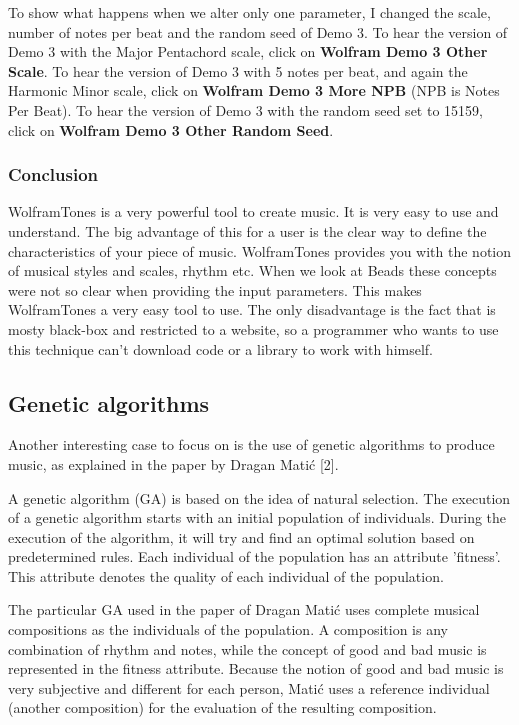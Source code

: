 \documentclass[12pt]{article}
\begin{document}
To show what happens when we alter only one parameter, I changed the scale, number of notes per beat and the random seed of Demo 3. To hear the version of Demo 3 with the Major Pentachord scale, click on \textbf{Wolfram Demo 3 Other Scale}. To hear the version of Demo 3 with 5 notes per beat, and again the Harmonic Minor scale, click on \textbf{Wolfram Demo 3 More NPB} (NPB is Notes Per Beat). To hear the version of Demo 3 with the random seed set to 15159, click on \textbf{Wolfram Demo 3 Other Random Seed}.

\subsubsection{Conclusion}

WolframTones is a very powerful tool to create music. It is very easy to use and understand. The big advantage of this for a user is the clear way to define the characteristics of your piece of music. WolframTones provides you with the notion of musical styles and scales, rhythm etc. When we look at Beads these concepts were not so clear when providing the input parameters. This makes WolframTones a very easy tool to use. The only disadvantage is the fact that is mosty black-box and restricted to a website, so a programmer who wants to use this technique can't download code or a library to work with himself.

\subsection{Genetic algorithms}

Another interesting case to focus on is the use of genetic algorithms to produce music, as explained in the paper by Dragan Mati\'c [2].
\newline

A genetic algorithm (GA) is based on the idea of natural selection. The execution of a genetic algorithm starts with an initial population of individuals. During the execution of the algorithm, it will try and find an optimal solution based on predetermined rules. Each individual of the population has an attribute 'fitness'. This attribute denotes the quality of each individual of the population.
\newline

The particular GA used in the paper of Dragan Mati\'c uses complete musical compositions as the individuals of the population. A composition is any combination of rhythm and notes, while the concept of good and bad music is represented in the fitness attribute. Because the notion of good and bad music is very subjective and different for each person, Mati\'c uses a reference individual (another composition) for the evaluation of the resulting composition.
\newline
\end{document}
